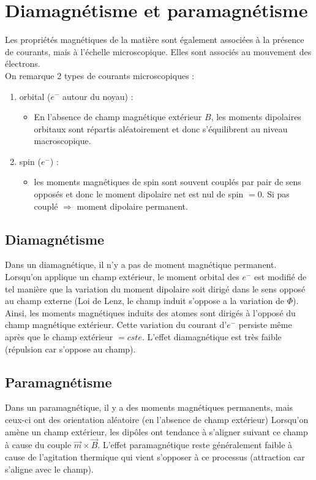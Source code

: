 \documentclass	[11pt, a4paper, openany]{book}
\begin{document}
\section{Diamagnétisme et paramagnétisme}
Les propriétés magnétiques de la matière sont également associées à la présence de courants, mais à l'échelle microscopique. Elles sont associés au mouvement des électrons.\\ On remarque 2 types de courants microscopiques : \begin{enumerate}
\item orbital ($e^-$ autour du noyau) : \begin{itemize}
\item En l'absence de champ magnétique extérieur $B$, les moments dipolaires orbitaux sont répartis aléatoirement et donc s'équilibrent au niveau macroscopique. 
\end{itemize}
\item spin ($e^-$) : \begin{itemize}
\item les moments magnétiques de spin sont souvent couplés par pair de sens opposés et donc le moment dipolaire net est nul de spin $=0$. Si pas couplé $\Rightarrow$ moment dipolaire permanent.
\end{itemize}
\end{enumerate}
\subsection{Diamagnétisme}
Dans un diamagnétique, il n'y a pas de moment magnétique permanent. Lorsqu'on applique un champ extérieur, le moment orbital des $e^-$ est modifié de tel manière que la variation du moment dipolaire soit dirigé dans le sens opposé au champ externe (Loi de Lenz, le champ induit s'oppose a la variation de $\Phi$). Ainsi, les moments magnétiques induits des atomes sont dirigés à l'opposé du champ magnétique extérieur. Cette variation du courant d'$e^-$ persiste même après que le champ extérieur $=cste$. L'effet diamagnétique est très faible (répulsion car s'oppose au champ). 
\subsection{Paramagnétisme}
Dans un paramagnétique, il y a des moments magnétiques permanents, mais ceux-ci ont des orientation aléatoire (en l'absence de champ extérieur) Lorsqu'on amène un champ extérieur, les dipôles ont tendance à s'aligner suivant ce champ à cause du couple $\vec{m}\times \vec{B}$. L'effet paramagnétique reste généralement faible à cause de l'agitation thermique qui vient s'opposer à ce processus (attraction car s'aligne avec le champ).
\end{document}

